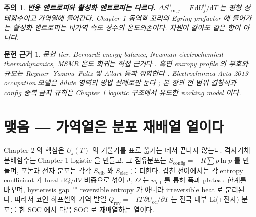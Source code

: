 \documentclass[11pt,a4paper]{article}
\newtheorem*{srcbox}{문헌 근거}
\newtheorem*{warnbox}{주의}
\newcommand{\dd}{\mathrm{d}}
\newcommand{\rxn}{\mathrm{rxn}}
\newcommand{\rev}{\mathrm{rev}}
\newcommand{\oc}{\mathrm{oc}}
\newcommand{\config}{\mathrm{config}}
\newcommand{\vib}{\mathrm{vib}}
\newcommand{\elec}{\mathrm{elec}}
\newcommand{\eff}{\mathrm{eff}}
\begin{document}
\begin{warnbox}
\textbf{반응 엔트로피와 활성화 엔트로피는 다르다.} $\Delta S^0_{\rxn,j}=F\,\dd U_j^0/\dd T$ 는 평형 상태함수이고
가역열에 들어간다. Chapter 1 동역학 꼬리의 Eyring prefactor 에 들어가는 활성화 엔트로피는 비가역 속도
상수의 온도의존이다. 차원이 같아도 같은 항이 아니다.
\end{warnbox}

\begin{srcbox}
문헌 tier. Bernardi energy balance, Newman electrochemical thermodynamics, MSMR 온도 회귀는 직접 근거다
\cite{bernardi1985,newman,msmr_partI,msmr_partII}. 흑연 entropy profile 의 부호와 규모는
Reynier--Yazami--Fultz 및 Allart 등과 정합한다 \cite{reynier2003,allart2018}. Electrochimica Acta 2019
occupation 모델은 dilute 영역의 방법 선례로만 둔다 \cite{occupation2019}; 본 장의 전 범위 겹침식과
config 중복 금지 규칙은 Chapter 1 logistic 구조에서 유도한 working model 이다.
\end{srcbox}

\section*{맺음 — 가역열은 분포 재배열 열이다}
Chapter 2 의 핵심은 $U_j(T)$ 의 기울기를 표로 옮기는 데서 끝나지 않는다. 격자기체 분배함수는
Chapter 1 logistic 을 만들고, 그 점유분포는 $S_{\config}=-R\sum p\ln p$ 를 만들며, 포논과 전자 분포는
각각 $S_{\vib}$ 와 $S_{\elec}$ 를 더한다. 겹친 전이에서는 각 entropy coefficient 가 local $\dd Q/\dd V$
비중으로 섞이고, $\Omega$ 는 $w_{\eff}$ 를 통해 폭과 plateau 한계를 바꾸며, hysteresis gap 은 reversible
entropy 가 아니라 irreversible heat 로 분리된다. 따라서 코인 하프셀의 가역 발열
$\dot Q_\rev=-IT\,\partial U_\oc/\partial T$ 는 전극 내부 Li(+전자) 분포를 한 SOC 에서 다음 SOC 로
재배열하는 열이다.
\end{document}
